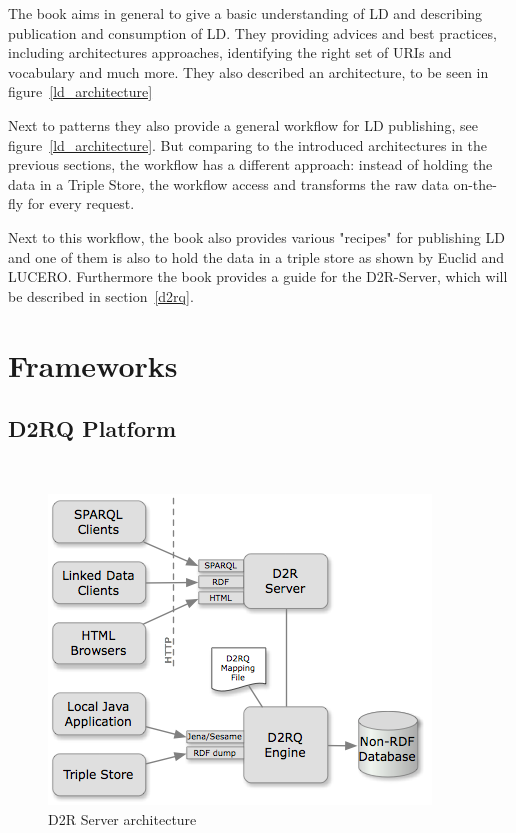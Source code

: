 The book aims in general to give a basic understanding of LD and describing publication and consumption of LD. They providing advices and best practices, including architectures approaches, identifying the right set of URIs and vocabulary and much more. They also described an architecture, to be seen in figure~\ref{ld_architecture}

Next to patterns they also provide a general workflow for LD publishing, see figure~\ref{ld_architecture}. But comparing to the introduced architectures in the previous sections, the workflow has a different approach: instead of holding the data in a Triple Store, the workflow access and transforms the raw data on-the-fly for every request.

Next to this workflow, the book also provides various "recipes" for publishing LD and one of them is also to hold the data in a triple store as shown by Euclid and LUCERO. Furthermore the book provides a guide for the D2R-Server, which will be described in section~\ref{d2rq}.

\section{Frameworks}

\subsection{D2RQ Platform}~\label{d2rq}

\begin{figure}[ht]
	\centering
\includegraphics[width=\textwidth]{img/d2rq_architecture.png}
	\caption{D2R Server architecture}
	\label{d2rq_architecture}
\end{figure}

